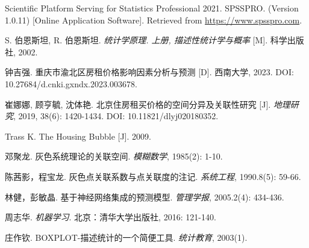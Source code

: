 \documentclass[12pt]{article}
\begin{document}
\begin{CJK}{UTF8}{gbsn}
		\newpage
		
		
		\begin{thebibliography}{99}
			
			 Scientific Platform Serving for Statistics Professional 2021. SPSSPRO. (Version 1.0.11) [Online Application Software]. Retrieved from \url{https://www.spsspro.com}.
			
			 S. 伯恩斯坦, R. 伯恩斯坦. \textit{统计学原理. 上册, 描述性统计学与概率} [M]. 科学出版社, 2002.
			
			 钟吉强. 重庆市渝北区房租价格影响因素分析与预测 [D]. 西南大学, 2023. DOI: 10.27684/d.cnki.gxndx.2023.003678.
			
			 崔娜娜, 顾亨毓, 沈体艳. 北京住房租买价格的空间分异及关联性研究 [J]. \textit{地理研究}, 2019, 38(6): 1420-1434. DOI: 10.11821/dlyj020180352.
			
			 Trass K. The Housing Bubble [J]. 2009.
			
			 邓聚龙. 灰色系统理论的关联空间. \textit{模糊数学}, 1985(2): 1-10.
			
			 陈茜影，程宝龙. 灰色点关联系数与点关联度的注记. \textit{系统工程}, 1990.8(5): 59-66.
			
			 林健，彭敏晶. 基于神经网络集成的预测模型. \textit{管理学报}, 2005.2(4): 434-436.
			
			 周志华. \textit{机器学习}. 北京：清华大学出版社, 2016: 121-140.
			
			 庄作钦. BOXPLOT-描述统计的一个简便工具. \textit{统计教育}, 2003(1).
			
		\end{thebibliography}
		
		
		
		
	\end{CJK}
\end{document}
